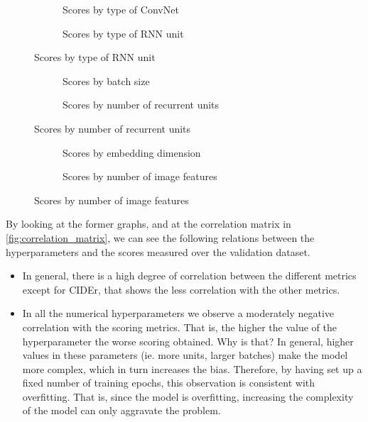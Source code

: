 \begin{figure}
  \begin{subfigure}[b]{0.5\textwidth}
    
    \caption{Scores by type of ConvNet}
    \label{fig:scores_by_cnn}
  \end{subfigure}
  \begin{subfigure}[b]{0.5\textwidth}
    
    \caption{Scores by type of RNN unit}
    \label{fig:scores_by_rnn}
  \end{subfigure}
\end{figure}

\begin{figure}
  \begin{subfigure}[b]{0.5\textwidth}
    
    \caption{Scores by batch size}
    \label{fig:scores_by_batch_size}
  \end{subfigure}
  \begin{subfigure}[b]{0.5\textwidth}
    
    \caption{Scores by number of recurrent units}
    \label{fig:scores_by_hidden_units}
  \end{subfigure}
\end{figure}

\begin{figure}
  \begin{subfigure}[b]{0.5\textwidth}
    
    \caption{Scores by embedding dimension}
    \label{fig:scores_by_embedding}
  \end{subfigure}
  \begin{subfigure}[b]{0.5\textwidth}
    
    \caption{Scores by number of image features}
    \label{fig:scores_by_features}
  \end{subfigure}
\end{figure}

By looking at the former graphs, and at the correlation matrix in \cref{fig:correlation_matrix}, we can see the following relations between the hyperparameters and the scores measured over the validation dataset.
\begin{itemize}
    \item In general, there is a high degree of correlation between the different metrics except for CIDEr, that shows the less correlation with the other metrics.
    \item In all the numerical hyperparameters we observe a moderately negative correlation with the scoring metrics. That is, the higher the value of the hyperparameter the worse scoring obtained. Why is that? In general, higher values in these parameters  (ie. more units, larger batches) make the model more complex, which in turn increases the bias. Therefore, by having set up a fixed number of training epochs, this observation is consistent with overfitting. That is, since the model is overfitting, increasing the complexity of the model can only aggravate the problem. 
\end{itemize}

